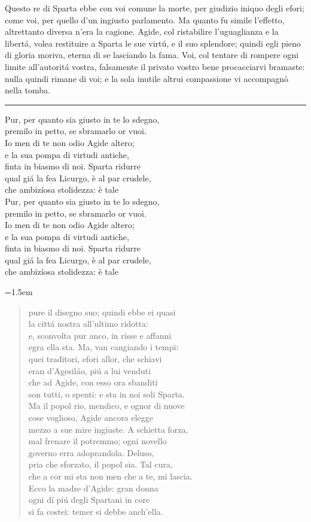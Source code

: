 \documentclass[a5paper,11pt]{memoir}
\def\testodicontrollo{%
Questo re di Sparta ebbe con voi comune la morte, per giudizio
iniquo degli efori; come voi, per quello d'un ingiusto parlamento.
Ma quanto fu simile l'effetto, altrettanto diversa n'era la
cagione. Agide, col ristabilire l'uguaglianza e la libertá, volea
restituire a Sparta le sue virtú, e il suo splendore; quindi egli
pieno di gloria moriva, eterna di se lasciando la fama. Voi, col
tentare di rompere ogni limite all'autoritá vostra, falsamente il
privato vostro bene procacciarvi bramaste: nulla quindi rimane di
voi; e la sola inutile altrui compassione vi accompagnò nella
tomba.
}
\begin{document}
\testodicontrollo

\noindent\rule{\leftmargini}{1pt}

\begin{versedrama}
  Pur, per quanto sia giusto in te lo sdegno,\\
  premilo in petto, se sbramarlo or vuoi.\\
  Io men di te non odio Agide altero;\\
  e la sua pompa di virtudi antiche,\\
  finta in biasmo di noi. Sparta ridurre\\
  qual giá la fea Licurgo, è al par crudele,\\
  che ambizíosa stolidezza: è tale\\
  Pur, per quanto sia giusto in te lo sdegno,\\
  premilo in petto, se sbramarlo or vuoi.\\
  Io men di te non odio Agide altero;\\
  e la sua pompa di virtudi antiche,\\
  finta in biasmo di noi. Sparta ridurre\\
  qual giá la fea Licurgo, è al par crudele,\\
  che ambizíosa stolidezza: è tale\\
\end{versedrama}

\leftmargini=1.5em

\begin{verse}
  pure il disegno suo; quindi ebbe ei quasi\\
  la cittá nostra all'ultimo ridotta:\\
  e, sconvolta pur anco, in risse e affanni\\
  egra ella sta. Ma, van cangiando i tempi:\\
  quei traditori, efori allor, che schiavi\\
  eran d'Agesiláo, piú a lui venduti\\
  che ad Agide, con esso ora sbanditi\\
  son tutti, o spenti: e sta in noi soli Sparta.\\
  Ma il popol rio, mendico, e ognor di nuove\\
  cose voglioso, Agide ancora elegge\\
  mezzo a sue mire ingiuste. A schietta forza,\\
  mal frenare il potremmo; ogni novello\\
  governo erra adoprandola. Deluso,\\
  pria che sforzato, il popol sia. Tal cura,\\
  che a cor mi sta non men che a te, mi lascia.\\
  Ecco la madre d'Agide: gran donna\\
  ogni dí piú degli Spartani in core\\
  si fa costei: temer si debbe anch'ella.\\
\end{verse}
\end{document}
